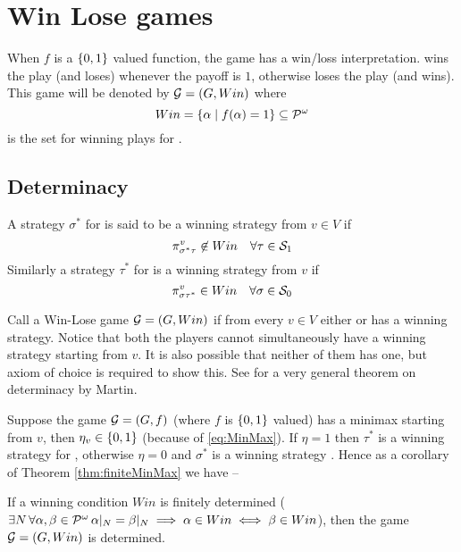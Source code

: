 \section{Win Lose games}
\label{sec:winlose}
When $f$ is a $\{0,1\}$ valued function, the game has a win/loss interpretation.  wins the play (and  loses) whenever the payoff is $1$, otherwise  loses the play (and  wins). This game will be denoted by $\mathcal{G}=(G,Win)$ where
\[
Win = \{ \alpha \mid f(\alpha) = 1\} \subseteq \mathcal{P}^\omega
\]
is the set for winning plays for .

\subsection{Determinacy}

A strategy $\sigma^*$ for  is said to be a winning strategy from $v \in V$ if 
\[
    \pi^v_{\sigma^*\tau} \not\in Win \quad \forall \tau \in \mathcal{S}_1
\]
Similarly a strategy $\tau^*$ for  is a winning strategy from $v$ if
\[
    \pi^v_{\sigma\tau^*} \in Win \quad \forall \sigma \in \mathcal{S}_0
\]

Call a Win-Lose game $\mathcal{G}=(G,Win)$  if from every $v \in V$ either  or  has a winning strategy. Notice that both the players cannot simultaneously have a winning strategy starting from $v$. It is also possible that neither of them has one, but axiom of choice is required to show this. See \cite{martin_borel_1975} for a very general theorem on determinacy by Martin.

Suppose the game $\mathcal{G}=(G,f)$ (where $f$ is $\{0,1\}$ valued) has a minimax \eqminmax starting from $v$, then $\eta_v \in \{0,1\}$ (because of \eqref{eq:MinMax}). If $\eta=1$ then $\tau^*$ is a winning strategy for , otherwise $\eta=0$ and $\sigma^*$ is a winning strategy . Hence as a corollary of Theorem \ref{thm:finiteMinMax} we have --
\\
\begin{corollary}
    \label{cor:finiteDeterminacy}
    If a winning condition $Win$ is finitely determined ($\exists N \, \forall \alpha,\beta \in \mathcal{P}^\omega \, \alpha|_N = \beta|_N \implies \alpha \in Win \iff \beta \in Win$), then the game $\mathcal{G}=(G,Win)$ is determined.
\end{corollary}

